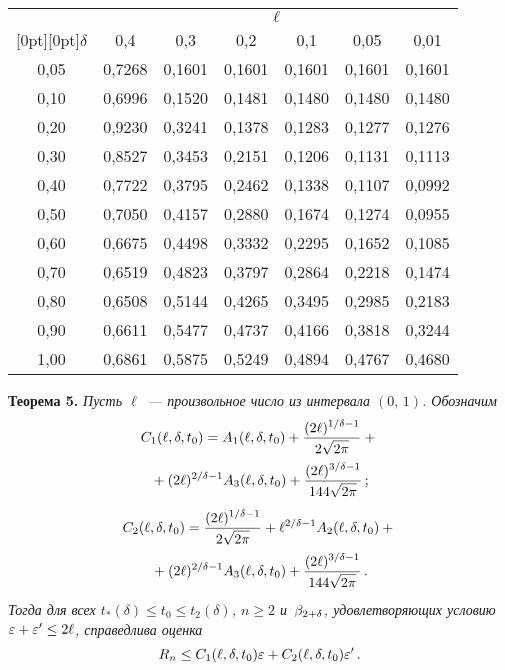 \begin{multicols}{2}
\begin{table*}[b]
\begin{center}
{}

\vspace*{2ex}


\tabcolsep=19pt
\begin{tabular}{|c|c|c|c|c|c|c|}
\hline
 & \multicolumn {6}{c|}{$\ell$}\\
 \cline{2-7}
\multicolumn{1}{|c|}{\raisebox{4pt}[0pt][0pt]{$\delta$}}&0,4&0,3&0,2&0,1&0,05&0,01\\ 
\hline
0,05&0,7268&0,1601&0,1601&0,1601&0,1601&0,1601\\
0,10&0,6996&0,1520&0,1481&0,1480&0,1480&0,1480\\
0,20&0,9230&0,3241&0,1378&0,1283&0,1277&0,1276\\
0,30&0,8527&0,3453&0,2151&0,1206&0,1131&0,1113\\
0,40&0,7722&0,3795&0,2462&0,1338&0,1107&0,0992\\
0,50&0,7050&0,4157&0,2880&0,1674&0,1274&0,0955\\
0,60&0,6675&0,4498&0,3332&0,2295&0,1652&0,1085\\
0,70&0,6519&0,4823&0,3797&0,2864&0,2218&0,1474\\
0,80&0,6508&0,5144&0,4265&0,3495&0,2985&0,2183\\
0,90&0,6611&0,5477&0,4737&0,4166&0,3818&0,3244\\
1,00&0,6861&0,5875&0,5249&0,4894&0,4767&0,4680\\
\hline
\end{tabular}
\end{center}
\end{table*}




\noindent
\textbf{Теорема 5.}
\textit{Пусть $\ell$~--- произвольное число из интервала $(0,\,1)$. Обозначим
\begin{multline*}
C_1(\ell,\delta,t_0)=A_1(\ell,\delta,t_0)+
\displaystyle\frac{\displaystyle (2\ell)^{1/\delta-1}\mathstrut}{\displaystyle 2\sqrt{2\pi}\mathstrut}+{}\\
{}+
(2\ell)^{2/\delta-1}A_3(\ell,\delta,t_0) +
\displaystyle\frac{\displaystyle (2\ell)^{3/\delta-1}\mathstrut}{\displaystyle 144\sqrt{2\pi}\mathstrut}\,;
\end{multline*}
\begin{multline*}
C_2(\ell,\delta,t_0)=\displaystyle\frac{\displaystyle (2\ell)^{1/\delta-1}\mathstrut}{\displaystyle 2\sqrt{2\pi}\mathstrut}+
\ell^{2/\delta-1}A_2(\ell,\delta,t_0)+{}\\
{}+ (2\ell)^{2/\delta-1}A_3(\ell,\delta,t_0)
+ \displaystyle\frac{\displaystyle (2\ell)^{3/\delta-1}\mathstrut}{\displaystyle 144\sqrt{2\pi}\mathstrut}\,.
\end{multline*}
Тогда для всех ${t_*(\delta)\le t_0\le t_2(\delta)}$, ${n\ge2}$
и~$\beta_{2+\delta}$, удовлетворяющих условию ${\varepsilon+\varepsilon'\le 2\ell}$, справедлива
оценка
$$
R_n\le C_1(\ell,\delta,t_0)\varepsilon+ C_2(\ell,\delta,t_0)\varepsilon'\,.
$$
}


\end{multicols}
